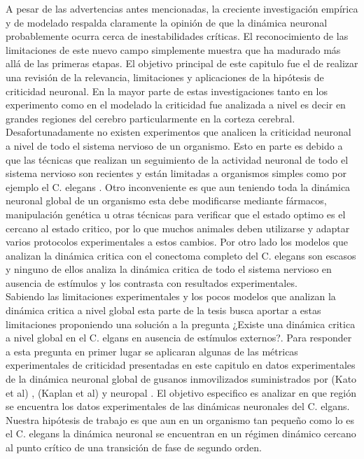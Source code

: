 A pesar de las advertencias antes mencionadas, la creciente investigación empírica y de modelado respalda claramente la opinión de que la dinámica neuronal probablemente ocurra cerca de inestabilidades críticas. El reconocimiento de las limitaciones de este nuevo campo simplemente muestra que ha madurado más allá de las primeras etapas. El objetivo principal de este capitulo fue el de realizar una revisión de la relevancia, limitaciones y aplicaciones de la hipótesis de criticidad neuronal.   En la mayor parte de estas investigaciones tanto en los experimento  como en  el modelado  la criticidad fue analizada a nivel  es decir en grandes regiones del cerebro particularmente en la corteza cerebral.  Desafortunadamente no existen experimentos que analicen la criticidad neuronal a nivel de todo el sistema nervioso de un organismo. Esto en parte es debido a que las técnicas que realizan  un seguimiento de la actividad neuronal de todo el sistema nervioso  son  recientes y están limitadas a organismos simples como por ejemplo el C. elegans \cite{kato_global_2015,kaplan_nested_2020,yemini_neuropal_2021}. Otro inconveniente es que aun teniendo toda la dinámica neuronal global  de un organismo esta debe modificarse  mediante fármacos, manipulación genética u otras técnicas para verificar que el estado optimo es el cercano al estado critico, por lo que muchos animales deben utilizarse y adaptar varios protocolos experimentales a estos cambios. Por otro lado los modelos que analizan la dinámica  critica  con el  conectoma completo del C. elegans son escasos  \cite{ciftci_synaptic_2018} y ninguno de ellos  analiza la dinámica critica de todo el sistema nervioso en ausencia de estímulos y los contrasta con resultados experimentales.\\

Sabiendo las limitaciones experimentales y los pocos modelos que analizan la dinámica critica a nivel global esta parte de la tesis busca  aportar  a estas limitaciones proponiendo una solución a la pregunta ¿Existe una dinámica critica a nivel global en el C. elgans  en ausencia de estímulos
externos?. Para responder a esta pregunta  en primer lugar  se aplicaran  algunas de las métricas experimentales de criticidad presentadas en este capitulo  en  datos experimentales de la dinámica neuronal global de  gusanos inmovilizados suministrados por (Kato et al) \cite{kato_global_2015}, (Kaplan et al)  \cite{kaplan_nested_2020} y neuropal \cite{yemini_neuropal_2021}.  El  objetivo especifico es analizar en que región se encuentra los datos experimentales de las   dinámicas neuronales del C. elgans.  Nuestra hipótesis de trabajo es que aun en un organismo tan pequeño como lo es el C. elegans la dinámica neuronal se encuentran en un régimen dinámico cercano al punto crítico de una transición de fase de segundo orden.\\


